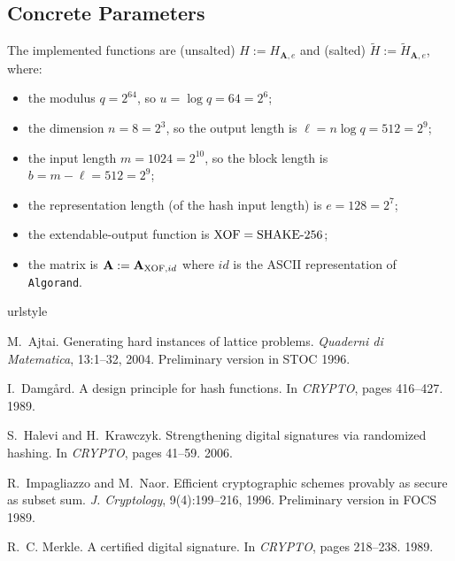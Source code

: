 \documentclass[11pt]{article}
\newcommand{\matA}{\ensuremath{\mathbf{A}}}
\numberwithin{equation}{section}
\begin{document}
\subsection{Concrete Parameters}
\label{sec:concrete-parameters}

The implemented functions are (unsalted) $H := H_{\matA,e}$ and
(salted) $\tilde{H} := \tilde{H}_{\matA,e}$, where:
\begin{itemize}
\item the modulus $q=2^{64}$, so $u = \log q = 64=2^{6}$;
\item the dimension $n = 8 = 2^{3}$, so the output length is
  $\ell = n \log q = 512 = 2^{9}$;
\item the input length $m = 1024 = 2^{10}$, so the block length is
  $b = m - \ell = 512 = 2^{9}$;
\item the representation length (of the hash input length) is $e = 128
  = 2^{7}$;
\item the extendable-output function is $\text{XOF} = \text{SHAKE-256}$;
\item the matrix is $\matA := \matA_{\xof,id}$ where $id$ is the ASCII
  representation of \verb=Algorand=.
\end{itemize}



\begin{thebibliography}{Dam89}
\expandafter\ifx\csname urlstyle\endcsname\relax
  \providecommand{\doi}[1]{doi:\discretionary{}{}{}#1}\else
  \providecommand{\doi}{doi:\discretionary{}{}{}\begingroup
  \urlstyle{rm}\Url}\fi

M.~Ajtai.
\newblock Generating hard instances of lattice problems.
\newblock \emph{Quaderni di Matematica}, 13:1--32, 2004.
\newblock Preliminary version in STOC 1996.

I.~Damg{\aa}rd.
\newblock A design principle for hash functions.
\newblock In \emph{CRYPTO}, pages 416--427. 1989.

S.~Halevi and H.~Krawczyk.
\newblock Strengthening digital signatures via randomized hashing.
\newblock In \emph{CRYPTO}, pages 41--59. 2006.

R.~Impagliazzo and M.~Naor.
\newblock Efficient cryptographic schemes provably as secure as subset sum.
\newblock \emph{J. Cryptology}, 9(4):199--216, 1996.
\newblock Preliminary version in FOCS 1989.

R.~C. Merkle.
\newblock A certified digital signature.
\newblock In \emph{CRYPTO}, pages 218--238. 1989.

\end{thebibliography}

\end{document}
